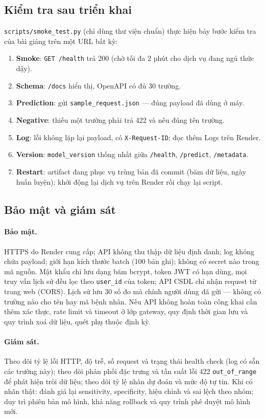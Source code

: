 \documentclass[12pt]{article}
\begin{document}
\subsection{Kiểm tra sau triển khai}
\texttt{scripts/smoke\_test.py} (chỉ dùng thư viện chuẩn) thực hiện bảy bước kiểm tra của bài giảng trên một URL bất kỳ:
\begin{enumerate}
  \item \textbf{Smoke}: \texttt{GET /health} trả 200 (chờ tối đa 2 phút cho dịch vụ đang ngủ thức dậy).
  \item \textbf{Schema}: \texttt{/docs} hiển thị, OpenAPI có đủ 30 trường.
  \item \textbf{Prediction}: gửi \texttt{sample\_request.json} --- đúng payload đã dùng ở máy.
  \item \textbf{Negative}: thiếu một trường phải trả 422 và nêu đúng tên trường.
  \item \textbf{Log}: lỗi không lặp lại payload, có \texttt{X-Request-ID}; đọc thêm Logs trên Render.
  \item \textbf{Version}: \texttt{model\_version} thống nhất giữa \texttt{/health}, \texttt{/predict}, \texttt{/metadata}.
  \item \textbf{Restart}: artifact đang phục vụ trùng bản đã commit (băm dữ liệu, ngày huấn luyện); khởi động lại
        dịch vụ trên Render rồi chạy lại script.
\end{enumerate}

\subsection{Bảo mật và giám sát}
\paragraph{Bảo mật.} HTTPS do Render cung cấp; API không thu thập dữ liệu định danh; log không chứa payload; giới
hạn kích thước batch (100 bản ghi); không có secret nào trong mã nguồn. Mật khẩu chỉ lưu dạng băm bcrypt, token JWT
có hạn dùng, mọi truy vấn lịch sử đều lọc theo \texttt{user\_id} của token; API CSDL chỉ nhận request từ trang web
(CORS). Lịch sử lưu 30 số đo mà chính người dùng đã gửi --- không có trường nào cho tên hay mã bệnh nhân. Nếu API không hoàn toàn công khai cần thêm
xác thực, rate limit và timeout ở lớp gateway, quy định thời gian lưu và quy trình xoá dữ liệu, quét phụ thuộc định kỳ.

\paragraph{Giám sát.} Theo dõi tỷ lệ lỗi HTTP, độ trễ, số request và trạng thái health check (log có sẵn các trường
này); theo dõi phân phối đặc trưng và tần suất lỗi 422 \texttt{out\_of\_range} để phát hiện trôi dữ liệu; theo dõi
tỷ lệ nhãn dự đoán và mức độ tự tin. Khi có nhãn thật: đánh giá lại sensitivity, specificity, hiệu chỉnh và sai lệch
theo nhóm; duy trì phiên bản mô hình, khả năng rollback và quy trình phê duyệt mô hình mới.
\end{document}
